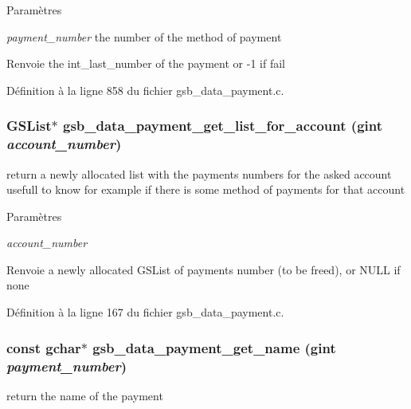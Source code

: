 \begin{DoxyParams}{Paramètres}
\item[{\em payment\_\-number}]the number of the method of payment\end{DoxyParams}
\begin{DoxyReturn}{Renvoie}
the int\_\-last\_\-number of the payment or -\/1 if fail 
\end{DoxyReturn}


Définition à la ligne 858 du fichier gsb\_\-data\_\-payment.c.

\subsubsection[{gsb\_\-data\_\-payment\_\-get\_\-list\_\-for\_\-account}]{\setlength{\rightskip}{0pt plus 5cm}GSList$\ast$ gsb\_\-data\_\-payment\_\-get\_\-list\_\-for\_\-account (gint {\em account\_\-number})}\label{gsb__data__payment_8h_abfa8982981645e91eef08885f26151df}
return a newly allocated list with the payments numbers for the asked account usefull to know for example if there is some method of payments for that account


\begin{DoxyParams}{Paramètres}
\item[{\em account\_\-number}]\end{DoxyParams}
\begin{DoxyReturn}{Renvoie}
a newly allocated GSList of payments number (to be freed), or NULL if none 
\end{DoxyReturn}


Définition à la ligne 167 du fichier gsb\_\-data\_\-payment.c.

\subsubsection[{gsb\_\-data\_\-payment\_\-get\_\-name}]{\setlength{\rightskip}{0pt plus 5cm}const gchar$\ast$ gsb\_\-data\_\-payment\_\-get\_\-name (gint {\em payment\_\-number})}\label{gsb__data__payment_8h_a3384c18af92833d2152faad71ccd16c4}
return the name of the payment


